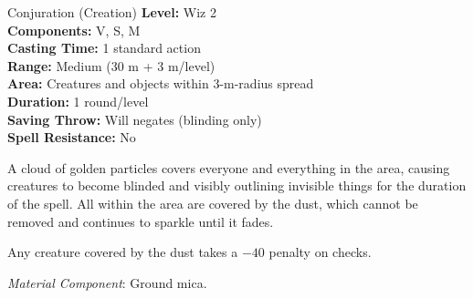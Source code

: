 {Conjuration (Creation)}
{
	\textbf{Level:}
	Wiz 2\\
	\textbf{Components:}
	V, S, M\\
	\textbf{Casting Time:}
	1 standard action\\
	\textbf{Range:}
	Medium (30 m + 3 m/level)\\
	\textbf{Area:}
	Creatures and objects within 3-m-radius spread\\
	\textbf{Duration:}
	1 round/level\\
	\textbf{Saving Throw:}
	Will negates (blinding only)\\
	\textbf{Spell Resistance:}
	No\\
}
{
	A cloud of golden particles covers everyone and everything in the area, causing creatures to become blinded and visibly outlining invisible things for the duration of the spell. All within the area are covered by the dust, which cannot be removed and continues to sparkle until it fades.

	Any creature covered by the dust takes a $-40$ penalty on  checks.

	\textit{Material Component}:
	Ground mica.

}
